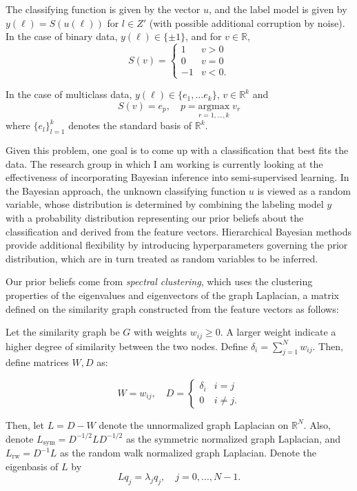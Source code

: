 \documentclass{siamart1116}
\begin{document}
    The classifying function is given by the vector $u$, and the label model is given by $y(\ell) = S(u(\ell))$ for $l \in Z'$ (with possible additional corruption by noise). In the case of binary data, $y(\ell) \in \{\pm 1\}$, and for $v \in \mathbb{R}$,
    \[
    S(v) = \begin{cases}
    1 & v>0\\
    0 & v=0\\
    -1 & v<0.
    \end{cases}
    \]

    In the case of multiclass data, $y(\ell) \in \{e_1, \ldots e_k\}$, $v \in \mathbb{R}^k$ and
    \[
    S(v) = e_p, \quad p = \underset{r =1,\ldots,k}{\mathrm{argmax}}\;v_r
    \]
    where $\{e_l\}_{l=1}^k$ denotes the standard basis of $\mathbb{R}^k$.

    Given this problem, one goal is to come up with a classification that best fits the data. The research group in which I am working is currently looking at the effectiveness of incorporating Bayesian inference into semi-supervised learning. In the Bayesian approach, the unknown classifying function $u$ is viewed as a random variable, whose distribution is determined by combining the labeling model $y$ with a probability distribution representing our prior beliefs about the classification and derived from the feature vectors. Hierarchical Bayesian methods provide additional flexibility by introducing hyperparameters governing the prior distribution, which are in turn treated as random variables to be inferred.

    Our prior beliefs come from \textit{spectral clustering}, which uses the clustering properties of the eigenvalues and eigenvectors of the graph Laplacian, a matrix defined on the similarity graph constructed from the feature vectors as follows:

    Let the similarity graph be $G$ with weights $w_{ij} \ge 0$. A larger weight indicate a higher degree of similarity between the two nodes. Define $\delta_i = \sum_{j=1}^N w_{ij}$. Then, define matrices $W, D$ as:

    \[W = w_{ij},\quad D = \begin{cases} 
    \delta_i    & i = j \\
    0           & i \neq j. 
    \end{cases}\]

    Then, let $L = D - W$ denote the unnormalized graph Laplacian on $\mathbb{R}^N$. Also, denote $L_\text{sym} = D^{-1/2}LD^{-1/2}$ as the symmetric normalized graph Laplacian, and $L_\text{rw}=D^{-1}L$ as the random walk normalized graph Laplacian. Denote the eigenbasis of $L$ by
    \begin{equation}
    \label{eqn:laplacian}
    Lq_j = \lambda_j q_j,\quad j=0,\ldots,N-1.
    \end{equation}
\end{document}
